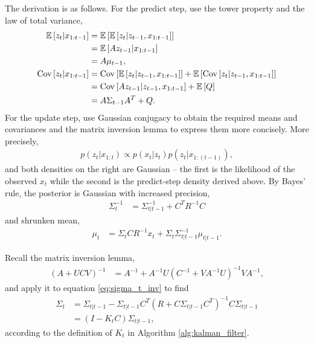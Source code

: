 The derivation is as follows. For the predict step, use the tower property and
the law of total variance,
\begin{align*}
  \mathbb{E}\left[{z_{t} \vert x_{1:t - 1}}\right] &= \mathbb{E}\left[{\mathbb{E}\left[{z_{t} \vert z_{t - 1}, x_{1:t - 1}}\right]}\right] \\
  & = \mathbb{E}\left[{Az_{t - 1}\vert x_{1:t - 1}}\right] \\
  &= A\mu_{t - 1}, \\
  \mathrm{Cov}\left[{z_{t} \vert x_{1:t - 1}}\right] &= \mathrm{Cov}\left[{\mathbb{E}\left[{z_{t} \vert z_{t - 1}, x_{1:t - 1}}\right]}\right] + \mathbb{E}\left[{\mathrm{Cov}\left[{z_{t} \vert z_{t - 1}, x_{1:t - 1}}\right]}\right] \\
  &= \mathrm{Cov}\left[{Az_{t - 1} \vert z_{t - 1}, x_{1:t - 1}}\right] + \mathbb{E}\left[{Q}\right] \\
  &= A\Sigma_{t - 1}A^{T} + Q.
\end{align*}
For the update step, use Gaussian conjugacy to obtain the required means and
covariances and the matrix inversion lemma to express them more concisely.
More precisely,
\begin{align*}
  p\left(z_{t} \vert x_{1:t}\right) \propto p\left(x_{t} \vert z_{t}\right)p\left(z_{t} \vert x_{1:\left(t - 1\right)}\right),
\end{align*}
and both densities on the right are Gaussian -- the first is the likelihood of
the observed $x_{t}$ while the second is the predict-step density derived above.
By Bayes' rule, the posterior is Gaussian with increased precision,
\begin{align}
  \label{eq:sigma_t_inv}
\Sigma_{t}^{-1} &= \Sigma_{t \vert t - 1}^{-1} + C^{T}R^{-1}C
\end{align}
and shrunken mean,
\begin{align}
  \label{eq:mu_t}
\mu_{t} &= \Sigma_{t}CR^{-1}x_{t} + \Sigma_{t}\Sigma_{t \vert t - 1}^{-1} \mu_{t \vert t - 1}.
\end{align}

Recall the matrix inversion lemma,
\begin{align*}
\left(A + UCV\right)^{-1} &= A^{-1} + A^{-1}U\left(C^{-1} + VA^{-1}U\right)^{-1}VA^{-1},
\end{align*}
and apply it to equation \ref{eq:sigma_t_inv} to find
\begin{align*}
  \Sigma_{t} &= \Sigma_{t \vert t - 1} - \Sigma_{t \vert t - 1}C^T\left(R + C \Sigma_{t \vert t - 1}C^{T}\right)^{-1}C\Sigma_{t \vert t - 1} \\
  &= \left(I - K_{t}C\right)\Sigma_{t \vert t - 1},
\end{align*}
according to the definition of $K_{t}$ in Algorithm
\ref{alg:kalman_filter}.

